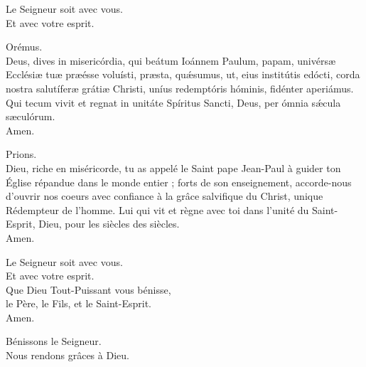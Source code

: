 \documentclass[twoside]{article}
\begin{document}
\begin{paracol}[1]{2}
\switchcolumn*


\switchcolumn

\vv Le Seigneur soit avec vous. \\
\rr Et avec votre esprit.

\switchcolumn*

Orémus.\\
Deus, dives in misericórdia, qui beátum Ioánnem Paulum, papam, univérsæ Ecclésiæ tuæ præésse voluísti, præsta, quǽsumus, ut, eius institútis edócti, corda nostra salutíferæ grátiæ Christi, uníus redemptóris hóminis, fidénter aperiámus. Qui tecum vivit et regnat in unitáte Spíritus Sancti, Deus, per ómnia sǽcula sæculórum.\\
\rr Amen.

\switchcolumn

Prions. \\
Dieu, riche en miséricorde, tu as appelé le Saint pape Jean-Paul à guider ton Église répandue dans le monde entier ; forts de son enseignement, accorde-nous d’ouvrir nos coeurs avec confiance à la grâce salvifique du Christ, unique Rédempteur de l’homme. Lui qui vit et règne avec toi dans l’unité du Saint-Esprit, Dieu, pour les siècles des siècles.\\
\rr Amen.

\switchcolumn*


\switchcolumn

\vv Le Seigneur soit avec vous. \\
\rr Et avec votre esprit.\\
\vv Que Dieu Tout-Puissant vous bénisse, \\
\hspace{2cm}le Père, le Fils, et le Saint-Esprit.\\
\rr Amen.

\switchcolumn*


\switchcolumn

\vv Bénissons le Seigneur. \\
\rr Nous rendons grâces à Dieu.


\end{paracol}
\end{document}
